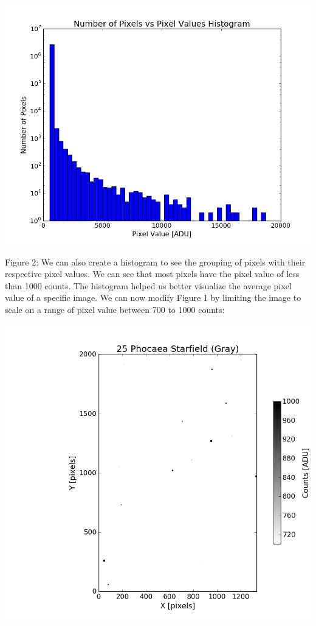 \documentclass[onecolumn, 12pt, a4paper]{article}
\begin{document}
\centerline{\includegraphics[scale=.37]{figure_1-2.png}}
\newline
Figure 2: We can also create a histogram to see the grouping of pixels with their respective pixel values. We can see that most pixels have the pixel value of less than 1000 counts. 
\newline
\newline
The histogram helped us better visualize the average pixel value of a specific image. We can now modify Figure 1 by limiting the image to scale on a range of pixel value between 700 to 1000 counts:

\centerline{\includegraphics[scale=.5]{figure_1-3.png}\hspace*{1.6cm}}
\newline
\end{document}
